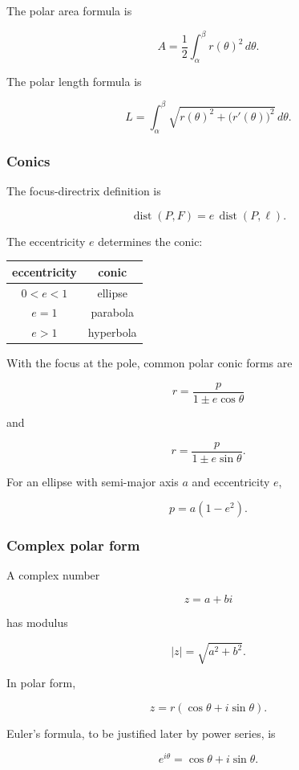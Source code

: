 The polar area formula is

\[
\boxed{
A=\frac12\int_\alpha^\beta r(\theta)^2\,d\theta.
}
\]

The polar length formula is

\[
\boxed{
L=
\int_\alpha^\beta
\sqrt{r(\theta)^2+\bigl(r'(\theta)\bigr)^2}\,d\theta.
}
\]

\subsubsection*{Conics}

The focus-directrix definition is

\[
\boxed{
\operatorname{dist}(P,F)=e\,\operatorname{dist}(P,\ell).
}
\]

The eccentricity \(e\) determines the conic:

\begin{center}
\begin{tabular}{c|c}
\textbf{eccentricity} & \textbf{conic} \\ \hline
\(0<e<1\) & ellipse \\[3pt]
\(e=1\) & parabola \\[3pt]
\(e>1\) & hyperbola
\end{tabular}
\end{center}

With the focus at the pole, common polar conic forms are

\[
\boxed{
r=\frac{p}{1\pm e\cos\theta}
}
\]

and

\[
\boxed{
r=\frac{p}{1\pm e\sin\theta}.
}
\]

For an ellipse with semi-major axis \(a\) and eccentricity \(e\),

\[
\boxed{
p=a(1-e^2).
}
\]

\subsubsection*{Complex polar form}

A complex number

\[
z=a+bi
\]

has modulus

\[
|z|=\sqrt{a^2+b^2}.
\]

In polar form,

\[
\boxed{
z=r(\cos\theta+i\sin\theta).
}
\]

Euler's formula, to be justified later by power series, is

\[
\boxed{
e^{i\theta}=\cos\theta+i\sin\theta.
}
\]

